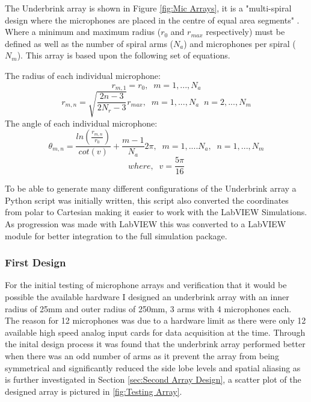 \documentclass{UoNMCHA}
\numberwithin{equation}{section}
\begin{document}
    The Underbrink array is shown in Figure \ref{fig:Mic Arrays}, it is a "multi-spiral design where the microphones are placed in the centre of equal area segments" \citep{Pri13}. Where a minimum and maximum radius ($r_0$ and $r_{max}$ respectively) must be defined as well as the number of spiral arms ($N_a$) and microphones per spiral ($N_m$). This array is based upon the following set of equations.
    
    The radius of each individual microphone:
    \begin{equation}
        r_{m,1} = r_0,\;\;m=1,...,N_a
    \end{equation}
    \begin{equation*}
        r_{m,n}=\sqrt{\frac{2n-3}{2N_r-3}}r_{max},\;\;m=1,...,N_a\;\;n=2,...,N_m
    \end{equation*}
    The angle of each individual microphone:
    \begin{equation}
        \theta_{m,n} = \frac{ln(\frac{r_{m,n}}{r_0})}{cot(v)} + \frac{m-1}{N_a}2\pi,\;\;m=1,....N_a,\;\;n=1,...,N_m
    \end{equation}
    \begin{equation*}
        where,\;\;v=\frac{5\pi}{16}
    \end{equation*}
    
    To be able to generate many different configurations of the Underbrink array a Python script was initially written, this script also converted the coordinates from polar to Cartesian making it easier to work with the LabVIEW Simulations. As progression was made with LabVIEW this was converted to a LabVIEW module for better integration to the full simulation package. 
\subsubsection{First Design} \label{sec:First Array Design}
    For the initial testing of microphone arrays and verification that it would be possible the available hardware I designed an underbrink array with an inner radius of 25mm and outer radius of 250mm, 3 arms with 4 microphones each. The reason for 12 microphones was due to a hardware limit as there were only 12 available high speed analog input cards for data acquisition at the time. Through the inital design process it was found that the underbrink array performed better when there was an odd number of arms as it prevent the array from being symmetrical and significantly reduced the side lobe levels and spatial aliasing as is further investigated in Section \ref{sec:Second Array Design}, a scatter plot of the designed array is pictured in \ref{fig:Testing Array}.
    
\end{document}
